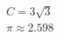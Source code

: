 \documentclass[preview]{standalone}
\begin{document}
\begin{align*}
C = 3\sqrt{3} \\\pi \approx 2.598
\end{align*}
\end{document}
